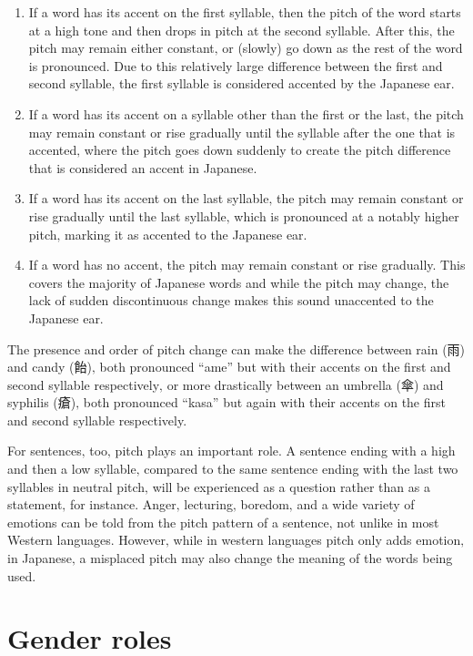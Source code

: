 \documentclass[11pt, b5paper, twoside, openright, onecolumn]{book}
\begin{document}
\begin{enumerate}
\item If a word has its accent on the first syllable‚ then the pitch of the word starts at a high tone and then drops in pitch at the second syllable. After this‚ the pitch may remain either constant‚ or (slowly) go down as the rest of the word is pronounced. Due to this relatively large difference between the first and second syllable‚ the first syllable is considered accented by the Japanese ear.
\item If a word has its accent on a syllable other than the first or the last‚ the pitch may remain constant or rise gradually until the syllable after the one that is accented‚ where the pitch goes down suddenly to create the pitch difference that is considered an accent in Japanese.
\item If a word has its accent on the last syllable‚ the pitch may remain constant or rise gradually until the last syllable‚ which is pronounced at a notably higher pitch‚ marking it as accented to the Japanese ear.
\item If a word has no accent‚ the pitch may remain constant or rise gradually. This covers the majority of Japanese words and while the pitch may change‚ the lack of sudden discontinuous change makes this sound unaccented to the Japanese ear.
\end{enumerate}

The presence and order of pitch change can make the difference between rain (雨) and candy (飴)‚ both pronounced “ame” but with their accents on the first and second syllable respectively‚ or more drastically between an umbrella (傘) and syphilis (瘡)‚ both pronounced “kasa” but again with their accents on the first and second syllable respectively.

For sentences‚ too‚ pitch plays an important role. A sentence ending with a high and then a low syllable‚ compared to the same sentence ending with the last two syllables in neutral pitch‚ will be experienced as a question rather than as a statement‚ for instance. Anger‚ lecturing‚ boredom‚ and a wide variety of emotions can be told from the pitch pattern of a sentence‚ not unlike in most Western languages. However‚ while in western languages pitch only adds emotion‚ in Japanese‚ a misplaced pitch may also change the meaning of the words being used.

\section{Gender roles}
\end{document}
